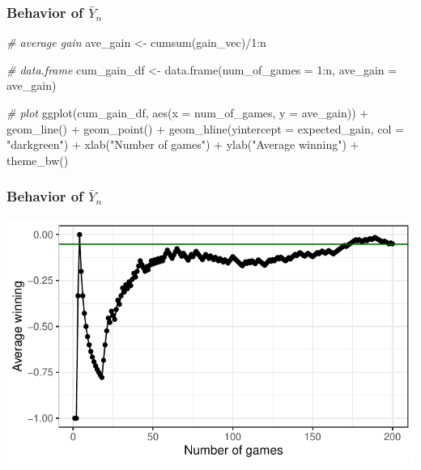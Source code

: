 \documentclass[
  ignorenonframetext,
]{beamer}
\newenvironment{Shaded}{\begin{snugshade}}{\end{snugshade}}
\newcommand{\AttributeTok}[1]{\textcolor[rgb]{0.77,0.63,0.00}{#1}}
\newcommand{\CommentTok}[1]{\textcolor[rgb]{0.56,0.35,0.01}{\textit{#1}}}
\newcommand{\DecValTok}[1]{\textcolor[rgb]{0.00,0.00,0.81}{#1}}
\newcommand{\FunctionTok}[1]{\textcolor[rgb]{0.00,0.00,0.00}{#1}}
\newcommand{\NormalTok}[1]{#1}
\newcommand{\OtherTok}[1]{\textcolor[rgb]{0.56,0.35,0.01}{#1}}
\newcommand{\SpecialCharTok}[1]{\textcolor[rgb]{0.00,0.00,0.00}{#1}}
\newcommand{\StringTok}[1]{\textcolor[rgb]{0.31,0.60,0.02}{#1}}
\begin{document}
\begin{frame}[fragile]
\frametitle{Behavior of $\bar{Y}_{n}$ }

\begin{Shaded}
\begin{Highlighting}[]
\CommentTok{\# average gain}
\NormalTok{ave\_gain }\OtherTok{\textless{}{-}} \FunctionTok{cumsum}\NormalTok{(gain\_vec)}\SpecialCharTok{/}\DecValTok{1}\SpecialCharTok{:}\NormalTok{n}

\CommentTok{\# data.frame}
\NormalTok{cum\_gain\_df }\OtherTok{\textless{}{-}} \FunctionTok{data.frame}\NormalTok{(}\AttributeTok{num\_of\_games =} \DecValTok{1}\SpecialCharTok{:}\NormalTok{n,}
                        \AttributeTok{ave\_gain =}\NormalTok{ ave\_gain)}
\end{Highlighting}
\end{Shaded}

\begin{Shaded}
\begin{Highlighting}[]
\CommentTok{\# plot}
\FunctionTok{ggplot}\NormalTok{(cum\_gain\_df, }
     \FunctionTok{aes}\NormalTok{(}\AttributeTok{x =}\NormalTok{ num\_of\_games, }\AttributeTok{y =}\NormalTok{ ave\_gain)) }\SpecialCharTok{+}
\FunctionTok{geom\_line}\NormalTok{() }\SpecialCharTok{+} \FunctionTok{geom\_point}\NormalTok{() }\SpecialCharTok{+}
\FunctionTok{geom\_hline}\NormalTok{(}\AttributeTok{yintercept =}\NormalTok{ expected\_gain, }\AttributeTok{col =} \StringTok{"darkgreen"}\NormalTok{) }\SpecialCharTok{+}
\FunctionTok{xlab}\NormalTok{(}\StringTok{"Number of games"}\NormalTok{) }\SpecialCharTok{+} 
\FunctionTok{ylab}\NormalTok{(}\StringTok{"Average winning"}\NormalTok{) }\SpecialCharTok{+}
\FunctionTok{theme\_bw}\NormalTok{()}
\end{Highlighting}
\end{Shaded}
\end{frame}

\begin{frame}
\frametitle{Behavior of $\bar{Y}_{n}$ }

\begin{center}\includegraphics[width=0.7\linewidth]{Probability_Statistics_101_v2_files/figure-beamer/unnamed-chunk-6-1} \end{center}
\end{frame}
\end{document}
